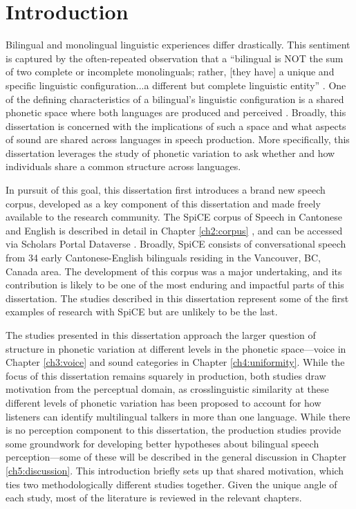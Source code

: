 
\chapter{Introduction}\label{ch1:intro}

Bilingual and monolingual linguistic experiences differ drastically. This sentiment is captured by the often-repeated observation that a ``bilingual is NOT the sum of two complete or incomplete monolinguals; rather, [they have] a unique and specific linguistic configuration...a different but complete linguistic entity'' \citep[][p. 6]{grosjean_1989_bilingual}. One of the defining characteristics of a bilingual's linguistic configuration is a shared phonetic space where both languages are produced and perceived \citep{flege_2021_slmr}. Broadly, this dissertation is concerned with the implications of such a space and what aspects of sound are shared across languages in speech production. More specifically, this dissertation leverages the study of phonetic variation to ask whether and how individuals share a common structure across languages. 

In pursuit of this goal, this dissertation first introduces a brand new speech corpus, developed as a key component of this dissertation and made freely available to the research community. The SpiCE corpus of Speech in Cantonese and English is described in detail in Chapter \ref{ch2:corpus} \citep[based on][]{johnson_2020_spice}, and can be accessed via Scholars Portal Dataverse \citep{johnson_2021_spice}. Broadly, SpiCE consists of conversational speech from 34 early Cantonese-English bilinguals residing in the Vancouver, BC, Canada area. The development of this corpus was a major undertaking, and its contribution is likely to be one of the most enduring and impactful parts of this dissertation. The studies described in this dissertation represent some of the first examples of research with SpiCE but are unlikely to be the last. 

The studies presented in this dissertation approach the larger question of structure in phonetic variation at different levels in the phonetic space---voice in Chapter \ref{ch3:voice} and sound categories in Chapter \ref{ch4:uniformity}. While the focus of this dissertation remains squarely in production, both studies draw motivation from the perceptual domain, as crosslinguistic similarity at these different levels of phonetic variation has been proposed to account for how listeners can identify multilingual talkers in more than one language. While there is no perception component to this dissertation, the production studies provide some groundwork for developing better hypotheses about bilingual speech perception---some of these will be described in the general discussion in Chapter \ref{ch5:discussion}. This introduction briefly sets up that shared motivation, which ties two methodologically different studies together. Given the unique angle of each study, most of the literature is reviewed in the relevant chapters. 

